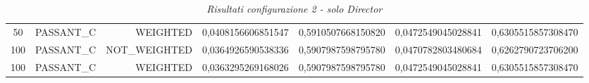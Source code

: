 \begin{table}[H]
{\begin{tabular}{ c l r c c c c }
				50 &  PASSANT\_C &   WEIGHTED & 0,0408156606851547 & 0,5910507668150820 & 0,0472549045028841 & 0,6305515857308470 \\
				
				100 &  PASSANT\_C & NOT\_WEIGHTED & 0,0364926590538336 & 0,5907987598795780 & 0,0470782803480684 & 0,6262790723706200 \\
				
				100 &  PASSANT\_C &   WEIGHTED & 0,0363295269168026 & 0,5907987598795780 & 0,0472549045028841 & 0,6305515857308470 \\
			\bottomrule
		\end{tabular}  
	}
	\caption{\emph{Risultati configurazione 2 - solo Director}}
\end{table} 

\setlength{\tabcolsep}{12pt}
